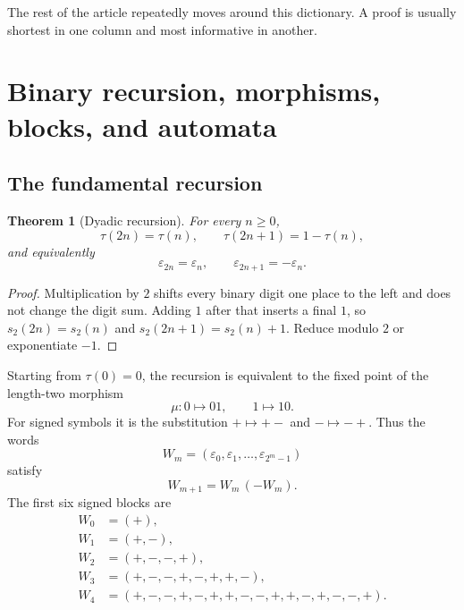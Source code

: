 \documentclass[11pt,oneside]{article}
\newtheorem{theorem}{Theorem}[section]
\theoremstyle{definition}
\theoremstyle{remark}
\newcommand{\bitsum}{s_2}
\newcommand{\eps}{\varepsilon}
\begin{document}
The rest of the article repeatedly moves around this dictionary.  A proof is
usually shortest in one column and most informative in another.

\section{Binary recursion, morphisms, blocks, and automata}

\subsection{The fundamental recursion}

\begin{theorem}[Dyadic recursion]\label{p3:thm:dyadic-recursion}
For every $n\ge0$,
\begin{equation}\label{p3:eq:dyadic-recursion}
 \tau(2n)=\tau(n),\qquad \tau(2n+1)=1-\tau(n),
\end{equation}
and equivalently
\begin{equation}\label{p3:eq:signed-dyadic-recursion}
 \eps_{2n}=\eps_n,\qquad \eps_{2n+1}=-\eps_n.
\end{equation}
\end{theorem}

\begin{proof}
Multiplication by $2$ shifts every binary digit one place to the left and does
not change the digit sum.  Adding $1$ after that inserts a final $1$, so
$\bitsum(2n)=\bitsum(n)$ and $\bitsum(2n+1)=\bitsum(n)+1$.  Reduce modulo $2$
or exponentiate $-1$.
\end{proof}

Starting from $\tau(0)=0$, the recursion is equivalent to the fixed point of
the length-two morphism
\begin{equation}\label{p3:eq:morphism}
  \mu:0\mapsto 01,\qquad 1\mapsto 10.
\end{equation}
For signed symbols it is the substitution $+\mapsto +-$ and
$-\mapsto-+$.  Thus the words
\[
  W_m=(\eps_0,\eps_1,\ldots,\eps_{2^m-1})
\]
satisfy
\begin{equation}\label{p3:eq:block-recursion}
  W_{m+1}=W_m\,(-W_m).
\end{equation}
The first six signed blocks are
\begin{align*}
 W_0&=(+),\\
 W_1&=(+,-),\\
 W_2&=(+,-,-,+),\\
 W_3&=(+,-,-,+,-,+,+,-),\\
 W_4&=(+,-,-,+,-,+,+,-,-,+,+,-,+,-,-,+).
\end{align*}
\end{document}
